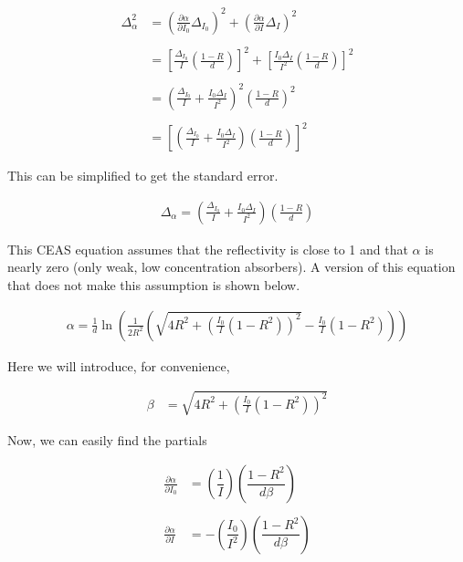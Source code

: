 \begin{align*}
  \Delta_\alpha^2 &= \left(\frac{\partial \alpha}{\partial I_0}\Delta_{I_0}\right)^2  + \left(\frac{\partial \alpha}{\partial I}\Delta_I\right)^2  \\\\
                  &= \left[\frac{\Delta_{I_0}}{I}\left(\frac{1-R}{d}\right)\right]^2 + \left[\frac{I_0 \Delta_I }{I^2}\left(\frac{1-R}{d}\right)\right]^2 \\\\
                  &= \left(\frac{\Delta_{I_0}}{I} + \frac{I_0\Delta_I}{I^2}\right)^2 \left(\frac{1-R}{d}\right)^2 \\\\
           &= \left[\left(\frac{\Delta_{I_0}}{I} + \frac{I_0\Delta_I}{I^2}\right) \left(\frac{1-R}{d}\right)\right]^2
\end{align*}

This can be simplified to get the standard error.

\begin{align}
  \Delta_\alpha = \left(\frac{\Delta_{I_0}}{I} + \frac{I_0\Delta_I}{I^2}\right) \left(\frac{1-R}{d}\right)\label{eq:err}
\end{align}

This CEAS equation assumes that the reflectivity is close to 1 and that
$\alpha$ is nearly zero (only weak, low concentration absorbers). A version
of this equation that does not make this assumption is shown below.

\begin{align}
  \alpha = \frac{1}{d}\ln\left(\frac{1}{2R^2}\left(\sqrt{4R^2+\left(\frac{I_0}{I}(1-R^2)\right)^2} - \frac{I_0}{I}(1-R^2)\right)\right)\label{eq:ceas_full}
\end{align}

Here we will introduce, for convenience,

\begin{align*}
  \beta &= \sqrt{4R^2+\left(\frac{I_0}{I}(1-R^2)\right)^2}
\end{align*}

Now, we can easily find the partials

\begin{align*}
  \frac{\partial \alpha}{\partial I_0} &= \left(\dfrac{1}{I}\right)\left(\dfrac{1-R^2}{d\beta}\right)\\\\
    \frac{\partial \alpha}{\partial I} &= -\left(\dfrac{I_0}{I^2}\right)\left(\dfrac{1-R^2}{d\beta}\right)
\end{align*}

